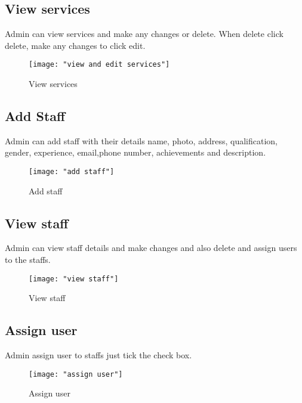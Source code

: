 \documentclass[a4paper,12pt,toc=flat]{report}
\begin{document}
{{	\subsection{View services}
	 \hspace*{12pt} Admin can view services and make any changes  or delete. When delete click delete, make any changes to click edit.
	\begin{figure}[bph] 
		\begin{center}
			\texttt{[image: "view and edit services"]}
		\end{center}
		\caption{View services}
	\end{figure}
	\pagebreak
	\subsection{Add Staff}
	 \hspace*{12pt} Admin can add staff with their details name, photo, address, qualification, gender, experience, email,phone number, achievements and description.
	\begin{figure}[bph] 
		\begin{center}
			\texttt{[image: "add staff"]}
		\end{center}
		\caption{Add staff}
	\end{figure}
	\pagebreak
	\subsection{View staff}
	 \hspace*{12pt} Admin can view staff details and make changes and also delete and assign users to the staffs.
	\begin{figure}[bph] 
		\begin{center}
			\texttt{[image: "view staff"]}
		\end{center}
		\caption{View staff}
	\end{figure}
	\pagebreak
	\subsection{Assign user}
	 \hspace*{12pt} Admin  assign user to staffs just tick the check box.
	\begin{figure}[bph]
		\begin{center}
			
			\texttt{[image: "assign user"]}
		\end{center}
		\caption{Assign user}
	\end{figure}
	
}}
\end{document}
